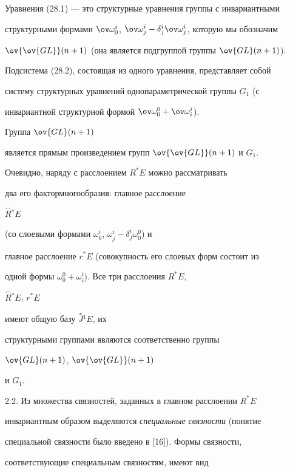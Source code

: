 Уравнения (28.1) --- это структурные уравнения группы с инвариантными 


структурными формами $\ov \omega_0^i$, $\ov \omega_j^i-\delta_j^i


\ov \omega_j^i$, которую мы обозначим


$\ov{\ov {GL}} ({n+1})$ (она является подгруппой группы $\ov {GL} ({n+1})$).


Подсистема (28.2), состоящая из одного уравнения, представляет собой 


систему структурных уравнений однопараметрической группы $G_1$ (с 


инвариантной структурной формой $\ov \omega_0^0+\ov \omega_i^i$).


Группа $\ov {GL} ({n+1})$


является прямым произведением групп $\ov{\ov {GL}} ({n+1})$ и $G_1$.





Очевидно, наряду с расслоением $R^*E$ можно рассматривать 


два его фактормногообразия: главное расслоение


$\overset{\frown}{R}{}^ * E$


(со слоевыми формами $\omega_0^i$, $\omega_j^i-\delta_j^i \omega_0^0$) и


главное расслоение $r^ * E$ (совокупность его слоевых форм состоит из 


одной формы $\omega_0^0+\omega_i^i$). Все три расслоения $R^ * E$,


$\overset{\frown}{R}{}^ * E$, $r^ * E$


имеют общую базу $\overset{*}{J}{}^1 E$, их


структурными группами являются соответственно группы


$\ov {GL} ({n+1})$, $\ov{\ov {GL}} ({n+1})$


и $G_1$.


\medskip


\addtocounter{equation}{1}





2.2. Из множества связностей, заданных в главном расслоении $R^*E$ 


инвариантным образом выделяются {\it специальные связности} (понятие 


специальной связности было введено в [16]). Формы связности,


соответствующие специальным связностям, имеют вид


